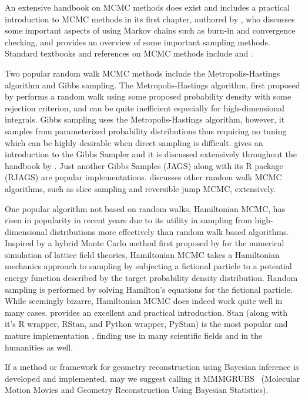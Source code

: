 An extensive handbook on MCMC methods does exist \citep{Brooks11} and includes a practical introduction to MCMC methods in its first chapter, authored by \citet{Geyer11}, who discusses some important aspects of using Markov chains such as burn-in and convergence checking, and provides an overview of some important sampling methods. Standard textbooks and references on MCMC methods include \citet{Gilks95} and \citet{Christian99}.

Two popular random walk MCMC methods include the Metropolis-Hastings algorithm and Gibbs sampling. The Metropolis-Hastings algorithm, first proposed by \citet{Metropolis53} performs a random walk using some proposed probability density with some rejection criterion, and can be quite inefficient especially for high-dimensional integrals. Gibbs sampling uses the Metropolis-Hastings algorithm, however, it samples from parameterized probability distributions thus requiring no tuning which can be highly desirable when direct sampling is difficult. \citet{Casella92} gives an introduction to the Gibbs Sampler and it is discussed extensively throughout the handbook by \citet{Brooks11}. Just another Gibbs Samples (JAGS) \citep{Plummer03} along with its R package (RJAGS) are popular implementations. \citet{Brooks11} discusses other random walk MCMC algorithms, such as slice sampling and reversible jump MCMC, extensively.

One popular algorithm not based on random walks, Hamiltonian MCMC, has risen in popularity in recent years due to its utility in sampling from high-dimensional distributions more effectively than random walk based algorithms. Inspired by a hybrid Monte Carlo method first proposed by \citet{Duane87} for the numerical simulation of lattice field theories, Hamiltonian MCMC takes a Hamiltonian mechanics approach to sampling by subjecting a fictional particle to a potential energy function described by the target probability density distribution. Random sampling is performed by solving Hamilton's equations for the fictional particle. While seemingly bizarre, Hamiltonian MCMC does indeed work quite well in many cases. \citet{Neal11} provides an excellent and practical introduction. Stan (along with it's R wrapper, RStan, and Python wrapper, PyStan) is the most popular and mature implementation \citep{Carpenter17}, finding use in many scientific fields and in the humanities as well.

If a method or framework for geometry reconstruction using Bayesian inference is developed and implemented, may we suggest calling it MMMGRUBS\footnotemark~ (Molecular Motion Movies and Geometry Reconstruction Using Bayesian Statistics).


